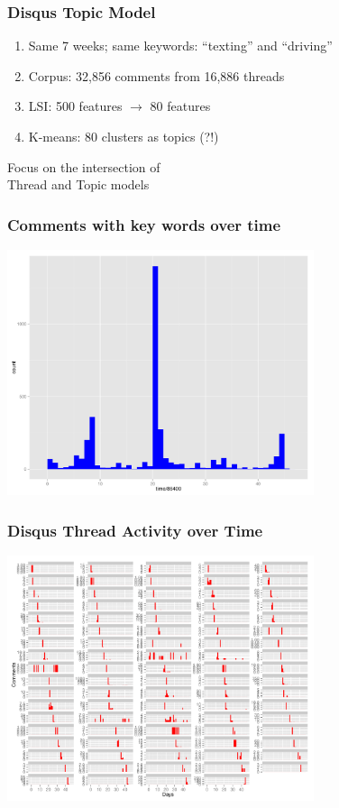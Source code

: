 \documentclass{beamer}
\begin{document}
\begin{frame}\frametitle{Disqus Topic Model}
\begin{center}
{\Large 
\begin{enumerate}
\item Same 7 weeks; same keywords: ``texting'' and ``driving''
\item Corpus:  32,856 comments from 16,886 threads
\item LSI: 500 features $\rightarrow$ 80 features
\item K-means: 80 clusters as topics (?!)
\end{enumerate}
}
\end{center}
\end{frame}

\begin{frame}
\begin{center}
{\Huge Focus on the intersection of \\[15 pt] Thread and Topic models}
\end{center}
\end{frame}

\begin{frame}\frametitle{Comments with key words over time}
  \begin{center}
    \includegraphics[width=9cm]{./imgs/time.pdf}
  \end{center}
\end{frame}

\begin{frame}\frametitle{Disqus Thread Activity over Time}
  \begin{center}
    \includegraphics[width=9cm]{./imgs/timebythread.pdf}
  \end{center}
\end{frame}
\end{document}
